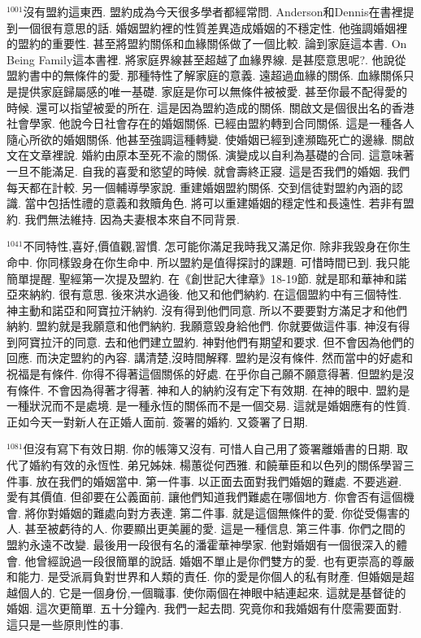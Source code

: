 \documentclass{book}
\begin{document}
$^{1001}$沒有盟約這東西.
盟約成為今天很多學者都經常問.
Anderson和Dennis在書裡提到一個很有意思的話.
婚姻盟約裡的性質差異造成婚姻的不穩定性.
他強調婚姻裡的盟約的重要性.
甚至將盟約關係和血緣關係做了一個比較.
論到家庭這本書.
On Being Family這本書裡.
將家庭界線甚至超越了血緣界線.
是甚麼意思呢?.
他說從盟約書中的無條件的愛.
那種特性了解家庭的意義.
遠超過血緣的關係.
血緣關係只是提供家庭歸屬感的唯一基礎.
家庭是你可以無條件被被愛.
甚至你最不配得愛的時候.
還可以指望被愛的所在.
這是因為盟約造成的關係.
關啟文是個很出名的香港社會學家.
他說今日社會存在的婚姻關係.
已經由盟約轉到合同關係.
這是一種各人隨心所欲的婚姻關係.
他甚至強調這種轉變.
使婚姻已經到達瀕臨死亡的邊緣.
關啟文在文章裡說.
婚約由原本至死不渝的關係.
演變成以自利為基礎的合同.
這意味著一旦不能滿足.
自我的喜愛和慾望的時候.
就會壽終正寢.
這是否我們的婚姻.
我們每天都在計較.
另一個輔導學家說.
重建婚姻盟約關係.
交到信徒對盟約內涵的認識.
當中包括性禮的意義和救贖角色.
將可以重建婚姻的穩定性和長遠性.
若非有盟約.
我們無法維持.
因為夫妻根本來自不同背景.

$^{1041}$不同特性,喜好,價值觀,習慣.
怎可能你滿足我時我又滿足你.
除非我毀身在你生命中.
你同樣毀身在你生命中.
所以盟約是值得探討的課題.
可惜時間已到.
我只能簡單提醒.
聖經第一次提及盟約.
在《創世記大律章》18-19節.
就是耶和華神和諾亞來納約.
很有意思.
後來洪水過後.
他又和他們納約.
在這個盟約中有三個特性.
神主動和諾亞和阿寶拉汗納約.
沒有得到他們同意.
所以不要要對方滿足才和他們納約.
盟約就是我願意和他們納約.
我願意毀身給他們.
你就要做這件事.
神沒有得到阿寶拉汗的同意.
去和他們建立盟約.
神對他們有期望和要求.
但不會因為他們的回應.
而決定盟約的內容.
講清楚,沒時間解釋.
盟約是沒有條件.
然而當中的好處和祝福是有條件.
你得不得著這個關係的好處.
在乎你自己願不願意得著.
但盟約是沒有條件.
不會因為得著才得著.
神和人的納約沒有定下有效期.
在神的眼中.
盟約是一種狀況而不是處境.
是一種永恆的關係而不是一個交易.
這就是婚姻應有的性質.
正如今天一對新人在正婚人面前.
簽署的婚約.
又簽署了日期.

$^{1081}$但沒有寫下有效日期.
你的帳簿又沒有.
可惜人自己用了簽署離婚書的日期.
取代了婚約有效的永恆性.
弟兄姊妹.
楊蕙從何西雅.
和饒華臣和以色列的關係學習三件事.
放在我們的婚姻當中.
第一件事.
以正面去面對我們婚姻的難處.
不要逃避.
愛有其價值.
但卻要在公義面前.
讓他們知道我們難處在哪個地方.
你會否有這個機會.
將你對婚姻的難處向對方表達.
第二件事.
就是這個無條件的愛.
你從受傷害的人.
甚至被虧待的人.
你要顯出更美麗的愛.
這是一種信息.
第三件事.
你們之間的盟約永遠不改變.
最後用一段很有名的潘霍華神學家.
他對婚姻有一個很深入的體會.
他曾經說過一段很簡單的說話.
婚姻不單止是你們雙方的愛.
也有更崇高的尊嚴和能力.
是受派肩負對世界和人類的責任.
你的愛是你個人的私有財產.
但婚姻是超越個人的.
它是一個身份,一個職事.
使你兩個在神眼中結連起來.
這就是基督徒的婚姻.
這次更簡單.
五十分鐘內.
我們一起去問.
究竟你和我婚姻有什麼需要面對.
這只是一些原則性的事.
\end{document}
